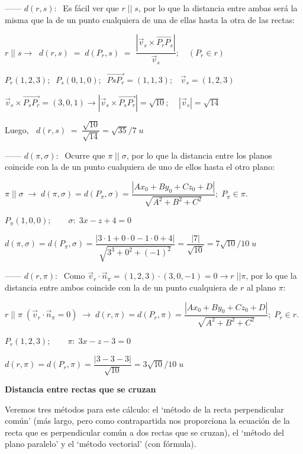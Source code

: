 \noindent ------ $d(r,s):\;$ Es fácil ver que $r\; ||\; s$, por lo que la distancia entre ambas será la misma que la de un punto cualquiera de una de ellas hasta la otra de las rectas:

\noindent $r\;||\;s\to \;\; d(r,s)\;=\;d(P_r,s)\;=\;\dfrac {|\vec v_s \times \overrightarrow{P_rP_s} |}{\vec v_s}; \quad (P_r\in r)$

\noindent $P_r(1,2,3);\;\; P_s(0,1,0);\;\; \overrightarrow{PsP_r}=(1,1,3);\;\;\;\vec v_s=(1,2,3)$

\noindent $\vec v_s \times \overrightarrow{P_sP_r}=(3,0,1) \to | \vec v_s \times \overrightarrow{P_sP_r}|=\sqrt{10};\;\; \;\;|\vec v_s|=\sqrt{14}$

\noindent Luego, $\;\; d(r,s)\;=\; \dfrac {\sqrt{10}}{\sqrt{14}}=\sqrt{35}/7\; u$

\noindent ------ $d(\pi,\sigma):\; $ Ocurre que $\pi\;||\;\sigma$, por lo que la distancia entre los planos coincide con la de un punto cualquiera de uno de ellos hasta el otro plano:

\noindent $\pi\;||\;\sigma \;\to \; d(\pi,\sigma)=d(P_\pi,\sigma)=\dfrac {|Ax_0+By_0+Cz_0+D|}{\sqrt{A^2+B^2+C^2}};\;P_{\pi}\in \pi$.

\noindent $P_{\pi}(1,0,0); \qquad \sigma:\; 3x-z+4=0$

\noindent $d(\pi,\sigma)=d(P_{\pi},\sigma)=\dfrac{|3\cdot 1+0\cdot 0-1\cdot 0+4|}{\sqrt{3^3+0^2+(-1)^2}}=\dfrac{|7|}{\sqrt{10}}=7\sqrt{10}/10\; u$

\noindent ------ $d(r,\pi):\;$ Como $\vec v_r \cdot \vec n_{\pi}=(1,2,3)\cdot (3,0,-1)=0 \to r\;||\pi$, por lo que la distancia entre ambos coincide con la de un punto cualquiera de $r$ al plano $\pi$:

\noindent \small{$r\;||\;\pi \;(\vec v_r \cdot \vec n_{\pi}=0)\;\to \; d(r,\pi)=d(P_r,\pi)=\dfrac {|Ax_0+By_0+Cz_0+D|}{\sqrt{A^2+B^2+C^2}};\;P_r\in r$}\normalsize{.}

\noindent $P_r(1,2,3);\qquad \pi:\; 3x-z-3=0$

\noindent $d(r,\pi)=d(P_r,\pi)=\dfrac{|3-3-3|}{\sqrt{10}}=3\sqrt{10}/10\; u$

\vspace{3mm} \large{\textbf{Distancia entre rectas que se cruzan}}

\normalsize{Veremos} tres métodos para este cálculo: el `método de la recta perpendicular común' (más largo, pero como contrapartida nos proporciona la ecuación de la recta que es perpendicular común a dos rectas que se cruzan), el `método del plano paralelo' y el `método vectorial' (con fórmula).

